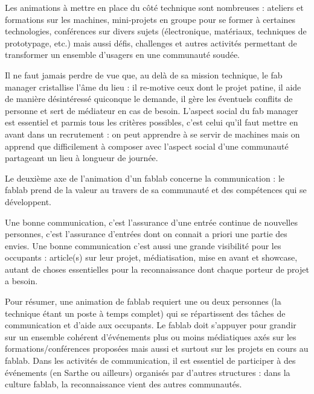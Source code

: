\documentclass[a4paper,10pt]{scrartcl}
\begin{document}
Les animations à mettre en place du côté technique sont nombreuses : ateliers et formations sur les machines, mini-projets en groupe pour se former à certaines technologies, conférences sur divers sujets (électronique, matériaux, techniques de prototypage, etc.) mais aussi défis, challenges et autres activités permettant de transformer un ensemble d'usagers en une communauté soudée.

Il ne faut jamais perdre de vue que, au delà de sa mission technique, le fab manager cristallise l'âme du lieu : il re-motive ceux dont le projet patine, il aide de manière désintéressé quiconque le demande, il gère les éventuels conflits de personne et sert de médiateur en cas de besoin. L'aspect social du fab manager est essentiel et parmis tous les critères possibles, c'est celui qu'il faut mettre en avant dans un recrutement : on peut apprendre à se servir de machines mais on apprend que difficilement à composer avec l'aspect social d'une communauté partageant un lieu à longueur de journée.

Le deuxième axe de l'animation d'un fablab concerne la communication : le fablab prend de la valeur au travers de sa communauté et des compétences qui se développent.

Une bonne communication, c'est l'assurance d'une entrée continue de nouvelles personnes, c'est l'assurance d'entrées dont on connait a priori une partie des envies. Une bonne communication c'est aussi une grande visibilité pour les occupants : article(s) sur leur projet, médiatisation, mise en avant et showcase, autant de choses essentielles pour la reconnaissance dont chaque porteur de projet a besoin.

Pour résumer, une animation de fablab requiert une ou deux personnes (la technique étant un poste à temps complet) qui se répartissent des tâches de communication et d'aide aux occupants. Le fablab doit s'appuyer pour grandir sur un ensemble cohérent d’événements plus ou moins médiatiques axés sur les formations/conférences proposées mais aussi et surtout sur les projets en cours au fablab. Dans les activités de communication, il est essentiel de participer à des événements (en Sarthe ou ailleurs) organisés par d'autres structures : dans la culture fablab, la reconnaissance vient des autres communautés.
\end{document}
